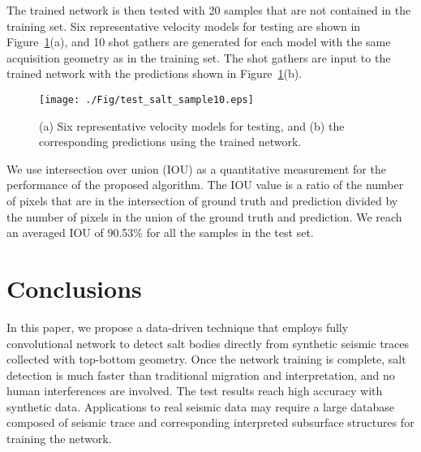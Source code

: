 \documentclass{cph18}
\begin{document}
The trained network is then tested with 20 samples that are not contained in the training set. Six representative velocity models for testing are shown in Figure~\ref{fig:test_salt_sample10}(a), and 10 shot gathers are generated for each model with the same acquisition geometry as in the training set. The shot gathers are input to the trained network with the predictions shown in Figure~\ref{fig:test_salt_sample10}(b).
\begin{figure}[!htb]
  \centering
  \texttt{[image: ./Fig/test\_salt\_sample10.eps]}
  \caption{(a) Six representative velocity models for testing, and (b) the corresponding predictions using the trained network.}
\label{fig:test_salt_sample10}
\end{figure}
We use intersection over union (IOU) as a quantitative measurement for the performance of the proposed algorithm. The IOU value is a ratio of the number of pixels that are in the intersection of ground truth and prediction divided by the number of pixels in the union of the ground truth and prediction.
We reach an averaged IOU of 90.53\% for all the samples in the test set.


\section{Conclusions}

In this paper, we propose a data-driven technique that employs fully convolutional network to detect salt bodies directly from synthetic seismic traces collected with top-bottom geometry. Once the network training is complete, salt detection is much faster than traditional migration and interpretation, and no human interferences are involved. The test results reach high accuracy with synthetic data. Applications to real seismic data may require a large database composed of seismic trace and corresponding interpreted subsurface structures for training the network.


\end{document}
